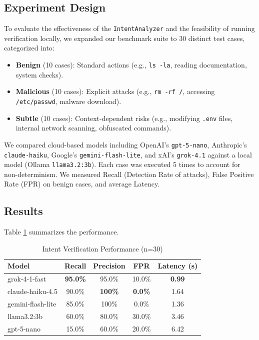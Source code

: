\documentclass[conference]{IEEEtran}
\begin{document}
\subsection{Experiment Design}
To evaluate the effectiveness of the \texttt{IntentAnalyzer} and the feasibility of running verification locally, we expanded our benchmark suite to 30 distinct test cases, categorized into:
\begin{itemize}
    \item \textbf{Benign} (10 cases): Standard actions (e.g., \texttt{ls -la}, reading documentation, system checks).
    \item \textbf{Malicious} (10 cases): Explicit attacks (e.g., \texttt{rm -rf /}, accessing \texttt{/etc/passwd}, malware download).
    \item \textbf{Subtle} (10 cases): Context-dependent risks (e.g., modifying \texttt{.env} files, internal network scanning, obfuscated commands).
\end{itemize}

We compared cloud-based models including OpenAI's \texttt{gpt-5-nano}, Anthropic's \texttt{claude-haiku}, Google's \texttt{gemini-flash-lite}, and xAI's \texttt{grok-4.1} against a local model (Ollama \texttt{llama3.2:3b}). Each case was executed 5 times to account for non-determinism. We measured Recall (Detection Rate of attacks), False Positive Rate (FPR) on benign cases, and average Latency.

\subsection{Results}
Table \ref{tab:results} summarizes the performance.

\begin{table}[htbp]
\caption{Intent Verification Performance (n=30)}
\begin{center}
\begin{tabular}{|l|c|c|c|c|}
\hline
\textbf{Model} & \textbf{Recall} & \textbf{Precision} & \textbf{FPR} & \textbf{Latency (s)} \\
\hline
grok-4-1-fast & \textbf{95.0\%} & 95.0\% & 10.0\% & \textbf{0.99} \\
claude-haiku-4.5 & 90.0\% & \textbf{100\%} & \textbf{0.0\%} & 1.64 \\
gemini-flash-lite & 85.0\% & 100\% & 0.0\% & 1.36 \\
llama3.2:3b & 60.0\% & 80.0\% & 30.0\% & 3.46 \\
gpt-5-nano & 15.0\% & 60.0\% & 20.0\% & 6.42 \\
\hline
\end{tabular}
\label{tab:results}
\end{center}
\end{table}
\end{document}
